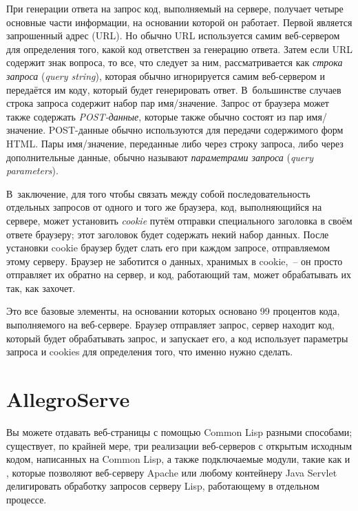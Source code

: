 При генерации ответа на запрос код, выполняемый на сервере, получает четыре основные
части информации, на основании которой он работает. Первой является запрошенный адрес
(URL). Но обычно URL используется самим веб-сервером для определения того, какой код
ответствен за генерацию ответа. Затем если URL содержит знак вопроса, то все, что
следует за ним, рассматривается как \textit{строка запроса} (\textit{query string}),
которая обычно игнорируется самим веб-сервером и передаётся им коду, который будет
генерировать ответ. В~большинстве случаев строка запроса содержит набор пар
имя/значение. Запрос от браузера может также содержать \textit{POST-данные}, которые также
обычно состоят из пар имя/значение. POST-данные обычно используются для передачи
содержимого форм HTML. Пары имя/значение, переданные либо через строку запроса, либо через
дополнительные данные, обычно называют \textit{параметрами запроса} (\textit{query
  parameters}).

В~заключение, для того чтобы связать между собой последовательность отдельных запросов от
одного и того же браузера, код, выполняющийся на сервере, может установить \textit{cookie}
путём отправки специального заголовка в своём ответе браузеру; этот заголовок будет
содержать некий набор данных. После установки cookie браузер будет слать его при каждом
запросе, отправляемом этому серверу. Браузер не заботится о данных, хранимых в cookie,~--
он просто отправляет их обратно на сервер, и код, работающий там, может обрабатывать их
так, как захочет.

Это все базовые элементы, на основании которых основано 99 процентов кода, выполняемого на
веб-сервере. Браузер отправляет запрос, сервер находит код, который будет обрабатывать
запрос, и запускает его, а код использует параметры запроса и cookies для определения
того, что именно нужно сделать.

\section{AllegroServe}

Вы можете отдавать веб-страницы с помощью Common Lisp разными способами; существует, по
крайней мере, три реализации веб-серверов с открытым исходным кодом, написанных на Common
Lisp, а также подключаемые модули, такие как
 и
\hspace{-0.25em}, которые позволяют веб-серверу Apache
или любому контейнеру Java Servlet делигировать обработку запросов серверу Lisp,
работающему в отдельном процессе.

